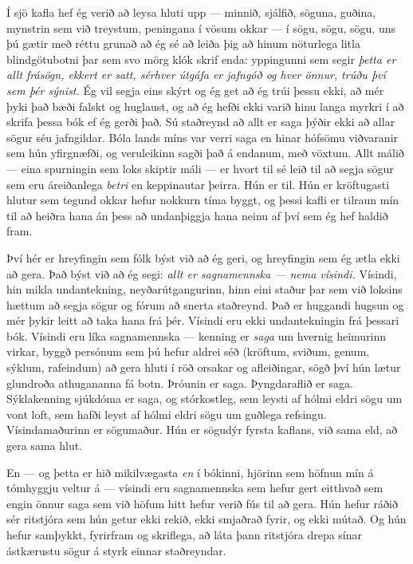 Í sjö kafla hef ég verið að leysa hluti upp — minnið, sjálfið, söguna, guðina, mynstrin sem við treystum, peningana í vösum okkar — í sögu, sögu, sögu, uns þú gætir með réttu grunað að ég sé að leiða þig að hinum nöturlega litla blindgötubotni þar sem svo mörg klók skrif enda: yppingunni sem segir \emph{þetta er allt frásögn, ekkert er satt, sérhver útgáfa er jafngóð og hver önnur, trúðu því sem þér sýnist.} Ég vil segja eins skýrt og ég get að ég trúi þessu ekki, að mér þyki það bæði falskt og huglaust, og að ég hefði ekki varið hinu langa myrkri í að skrifa þessa bók ef ég gerði það. Sú staðreynd að allt er saga þýðir ekki að allar sögur séu jafngildar. Bóla lands míns var verri saga en hinar hófsömu viðvaranir sem hún yfirgnæfði, og veruleikinn sagði það á endanum, með vöxtum. Allt málið — eina spurningin sem loks skiptir máli — er hvort til sé leið til að segja sögur sem eru áreiðanlega \emph{betri} en keppinautar þeirra. Hún er til. Hún er kröftugasti hlutur sem tegund okkar hefur nokkurn tíma byggt, og þessi kafli er tilraun mín til að heiðra hana án þess að undanþiggja hana neinu af því sem ég hef haldið fram.

Því hér er hreyfingin sem fólk býst við að ég geri, og hreyfingin sem ég ætla ekki að gera. Það býst við að ég segi: \emph{allt er sagnamennska — nema vísindi.} Vísindi, hin mikla undantekning, neyðarútgangurinn, hinn eini staður þar sem við loksins hættum að segja sögur og fórum að snerta staðreynd. Það er huggandi hugsun og mér þykir leitt að taka hana frá þér. Vísindi eru ekki undantekningin frá þessari bók. Vísindi eru líka sagnamennska — kenning er \emph{saga} um hvernig heimurinn virkar, byggð persónum sem þú hefur aldrei séð (kröftum, sviðum, genum, sýklum, rafeindum) að gera hluti í röð orsakar og afleiðingar, sögð því hún lætur glundroða athugananna fá botn. Þróunin er saga. Þyngdaraflið er saga. Sýklakenning sjúkdóma er saga, og stórkostleg, sem leysti af hólmi eldri sögu um vont loft, sem hafði leyst af hólmi eldri sögu um guðlega refsingu. Vísindamaðurinn er sögumaður. Hún er sögudýr fyrsta kaflans, við sama eld, að gera sama hlut.

En — og þetta er hið mikilvægasta \emph{en} í bókinni, hjörinn sem höfnun mín á tómhyggju veltur á — vísindi eru sagnamennska sem hefur gert eitthvað sem engin önnur saga sem við höfum hitt hefur verið fús til að gera. Hún hefur ráðið sér ritstjóra sem hún getur ekki rekið, ekki smjaðrað fyrir, og ekki mútað. Og hún hefur samþykkt, fyrirfram og skriflega, að láta þann ritstjóra drepa sínar ástkærustu sögur á styrk einnar staðreyndar.

